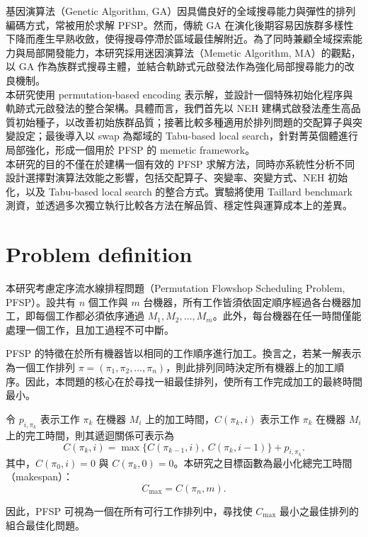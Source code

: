 \documentclass[conference]{IEEEtran}
\begin{document}
基因演算法（Genetic Algorithm, GA）因具備良好的全域搜尋能力與彈性的排列編碼方式，常被用於求解 PFSP。然而，傳統 GA 在演化後期容易因族群多樣性下降而產生早熟收斂，使得搜尋停滯於區域最佳解附近。為了同時兼顧全域探索能力與局部開發能力，本研究採用迷因演算法（Memetic Algorithm, MA）的觀點，以 GA 作為族群式搜尋主體，並結合軌跡式元啟發法作為強化局部搜尋能力的改良機制。\\

本研究使用 permutation-based encoding 表示解，並設計一個特殊初始化程序與軌跡式元啟發法的整合架構。具體而言，我們首先以 NEH 建構式啟發法產生高品質初始種子，以改善初始族群品質；接著比較多種適用於排列問題的交配算子與突變設定；最後導入以 swap 為鄰域的 Tabu-based local search，針對菁英個體進行局部強化，形成一個用於 PFSP 的 memetic framework。\\

本研究的目的不僅在於建構一個有效的 PFSP 求解方法，同時亦系統性分析不同設計選擇對演算法效能之影響，包括交配算子、突變率、突變方式、NEH 初始化，以及 Tabu-based local search 的整合方式。實驗將使用 Taillard benchmark 測資，並透過多次獨立執行比較各方法在解品質、穩定性與運算成本上的差異。\\




\section{Problem definition}
本研究考慮定序流水線排程問題（Permutation Flowshop Scheduling Problem, PFSP）。設共有 \(n\) 個工作與 \(m\) 台機器，所有工作皆須依固定順序經過各台機器加工，即每個工作都必須依序通過 \(M_1, M_2, \dots, M_m\)。此外，每台機器在任一時間僅能處理一個工作，且加工過程不可中斷。

PFSP 的特徵在於所有機器皆以相同的工作順序進行加工。換言之，若某一解表示為一個工作排列 \(\pi = (\pi_1, \pi_2, \dots, \pi_n)\)，則此排列同時決定所有機器上的加工順序。因此，本問題的核心在於尋找一組最佳排列，使所有工作完成加工的最終時間最小。

令 \(p_{i,\pi_k}\) 表示工作 \(\pi_k\) 在機器 \(M_i\) 上的加工時間，\(C(\pi_k, i)\) 表示工作 \(\pi_k\) 在機器 \(M_i\) 上的完工時間，則其遞迴關係可表示為
\[C(\pi_k, i) = \max \{ C(\pi_{k-1}, i),\ C(\pi_k, i-1) \} + p_{i,\pi_k}.\]
其中，\(C(\pi_0, i) = 0\) 與 \(C(\pi_k, 0) = 0\)。本研究之目標函數為最小化總完工時間（makespan）：
\[C_{\max} = C(\pi_n, m).\]

因此，PFSP 可視為一個在所有可行工作排列中，尋找使 \(C_{\max}\) 最小之最佳排列的組合最佳化問題。
\end{document}
